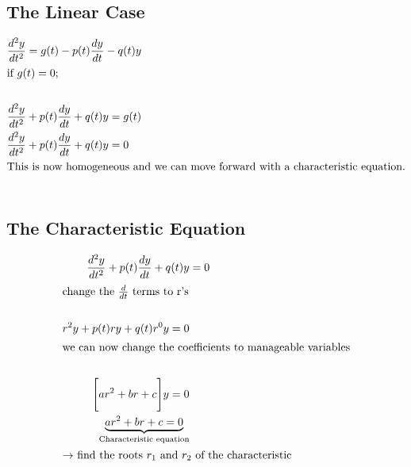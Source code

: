\documentclass[11pt]{article}
\begin{document}
\subsection*{The Linear Case}
\begin{align*}
    &\frac{d^2y}{dt^2}=g(t)-p(t)\frac{dy}{dt}-q(t)y\\
    \intertext{if $g(t)=0$;}\\
    &\frac{d^2y}{dt^2}+p(t)\frac{dy}{dt}+q(t)y=g(t)\\        &\frac{d^2y}{dt^2}+p(t)\frac{dy}{dt}+q(t)y=0\\
    \intertext{This is now homogeneous and we can move forward with a characteristic equation.}\\
\end{align*}
\subsection*{The Characteristic Equation}
\begin{align*}
    \frac{d^2y}{dt^2}+p(t)\frac{dy}{dt}+q(t)y&=0\\
    \intertext{change the $\frac{d}{dt}$ terms to r's}\\
    r^2y+p(t)ry+q(t)r^0y=0\\
    \intertext{we can now change the coefficients to manageable variables}\\
    \Bigg[ar^2+br+c\Bigg]y=0\\
    \underbrace{ar^2+br+c=0}_{\text{Characteristic equation}}\\
    \intertext{$\rightarrow$ find the roots $r_1$ and $r_2$ of the characteristic}\\
\end{align*}
\end{document}
